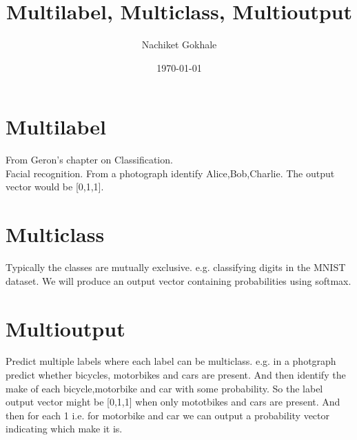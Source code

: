\documentclass{article}
\begin{document}
\title{Multilabel, Multiclass, Multioutput}
\author{Nachiket Gokhale}
\date{\today}
\maketitle
%
\section{Multilabel}
From Geron's chapter on Classification.\\
Facial recognition. From a photograph identify Alice,Bob,Charlie. The output vector would be [0,1,1].
%
\section{Multiclass}
%
Typically the classes are mutually exclusive. e.g. classifying digits in the MNIST dataset. We will produce an output vector containing probabilities using softmax.
%
\section{Multioutput}
Predict multiple labels where each label can be multiclass. e.g. in a photgraph predict whether bicycles, motorbikes and cars are present. And then identify the make of each bicycle,motorbike and car with some probability. So the label output vector might be [0,1,1] when only mototbikes and cars are present. And then for each 1 i.e. for motorbike and car we can output a probability vector indicating which make it is. 
%
\end{document}
